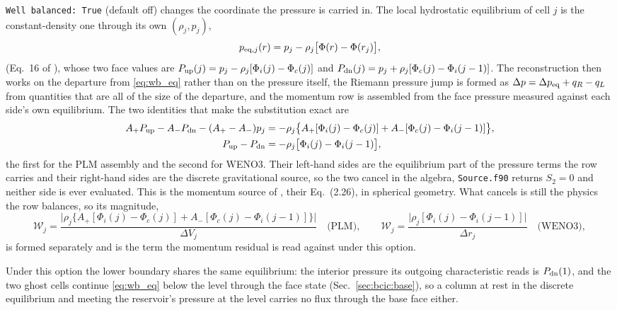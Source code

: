 \texttt{Well balanced: True} (default off) changes the coordinate the
pressure is carried in.  The local hydrostatic equilibrium of cell $j$ is the
constant-density one through its own $(\rho_j, p_j)$,
%
\begin{equation}
  p_{{\rm eq},j}(r) = p_j - \rho_j\bigl[\Phi(r) - \Phi(r_j)\bigr],
  \label{eq:wb_eq}
\end{equation}
%
(Eq.~16 of \citealt{Kaeppeli2016}), whose two face values are
$P_{\rm up}(j) = p_j - \rho_j[\Phi_i(j)-\Phi_c(j)]$ and
$P_{\rm dn}(j) = p_j + \rho_j[\Phi_c(j)-\Phi_i(j-1)]$.  The reconstruction
then works on the departure from \eqref{eq:wb_eq} rather than on the pressure
itself, the Riemann pressure jump is formed as
$\Delta p = \Delta p_{\rm eq} + q_R - q_L$ from quantities that are all of
the size of the departure, and the momentum row is assembled from the face
pressure measured against each side's own equilibrium.  The two identities
that make the substitution exact are
%
\begin{equation}
  \begin{aligned}
    A_+P_{\rm up} - A_-P_{\rm dn} - (A_+-A_-)p_j
      &= -\rho_j\bigl\{A_+[\Phi_i(j)-\Phi_c(j)]
         + A_-[\Phi_c(j)-\Phi_i(j-1)]\bigr\}, \\
    P_{\rm up} - P_{\rm dn} &= -\rho_j\bigl[\Phi_i(j)-\Phi_i(j-1)\bigr],
  \end{aligned}
  \label{eq:wb_identities}
\end{equation}
%
the first for the PLM assembly and the second for WENO3.  Their left-hand
sides are the equilibrium part of the pressure terms the row carries and
their right-hand sides are the discrete gravitational source, so the two
cancel in the algebra, \texttt{Source.f90} returns $S_2 = 0$ and neither side
is ever evaluated.  This is the momentum source of
\citet{Kaeppeli2014}, their Eq.~(2.26), in spherical geometry.  What cancels is
still the physics the row balances, so its magnitude,
%
\begin{equation}
  \mathcal{W}_j = \frac{\bigl|\rho_j\{A_+[\Phi_i(j)-\Phi_c(j)]
        + A_-[\Phi_c(j)-\Phi_i(j-1)]\}\bigr|}{\Delta V_j}
  \quad\text{(PLM)},\qquad
  \mathcal{W}_j = \frac{\bigl|\rho_j[\Phi_i(j)-\Phi_i(j-1)]\bigr|}{\Delta r_j}
  \quad\text{(WENO3)},
  \label{eq:wb_weight}
\end{equation}
%
is formed separately and is the term the momentum residual is read against
under this option.

Under this option the lower boundary shares the same equilibrium: the
interior pressure its outgoing characteristic reads is $P_{\rm dn}(1)$, and
the two ghost cells continue \eqref{eq:wb_eq} below the level through the
face state (Sec.~\ref{sec:bcic:base}), so a column at rest in the discrete
equilibrium and meeting the reservoir's pressure at the level carries no
flux through the base face either.

